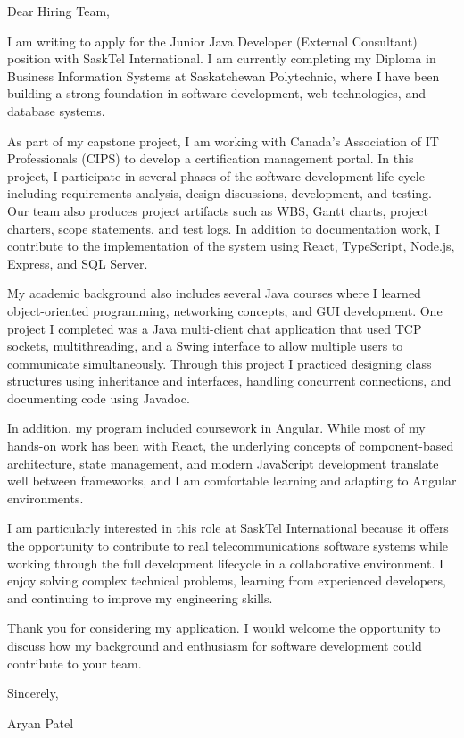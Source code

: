 \documentclass[letterpaper,11pt]{article}
\begin{document}
\vspace{10pt}

Dear Hiring Team,

I am writing to apply for the Junior Java Developer (External Consultant) position with SaskTel International. I am currently completing my Diploma in Business Information Systems at Saskatchewan Polytechnic, where I have been building a strong foundation in software development, web technologies, and database systems.

As part of my capstone project, I am working with Canada’s Association of IT Professionals (CIPS) to develop a certification management portal. In this project, I participate in several phases of the software development life cycle including requirements analysis, design discussions, development, and testing. Our team also produces project artifacts such as WBS, Gantt charts, project charters, scope statements, and test logs. In addition to documentation work, I contribute to the implementation of the system using React, TypeScript, Node.js, Express, and SQL Server.

My academic background also includes several Java courses where I learned object-oriented programming, networking concepts, and GUI development. One project I completed was a Java multi-client chat application that used TCP sockets, multithreading, and a Swing interface to allow multiple users to communicate simultaneously. Through this project I practiced designing class structures using inheritance and interfaces, handling concurrent connections, and documenting code using Javadoc.

In addition, my program included coursework in Angular. While most of my hands-on work has been with React, the underlying concepts of component-based architecture, state management, and modern JavaScript development translate well between frameworks, and I am comfortable learning and adapting to Angular environments.

I am particularly interested in this role at SaskTel International because it offers the opportunity to contribute to real telecommunications software systems while working through the full development lifecycle in a collaborative environment. I enjoy solving complex technical problems, learning from experienced developers, and continuing to improve my engineering skills.

Thank you for considering my application. I would welcome the opportunity to discuss how my background and enthusiasm for software development could contribute to your team.

\vspace{10pt}

Sincerely,

\vspace{10pt}

Aryan Patel
\end{document}
